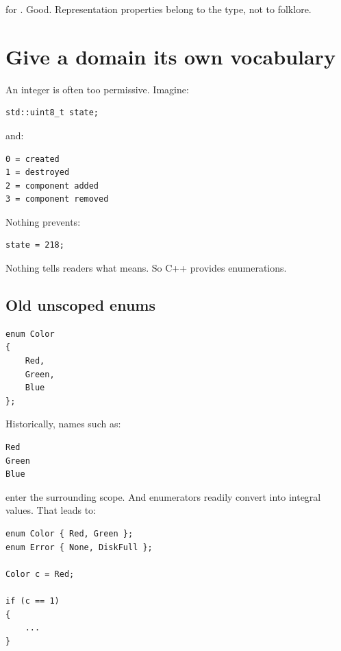 for . Good. Representation properties belong to the type, not to folklore.

\section{Give a domain its own vocabulary}\label{05-engine-i-ch002-give-a-domain-its-own-vocabulary}

\hypertarget{05-engine-i-ch002-give-a-domain-its-own-vocabulary}{}

An integer is often too permissive. Imagine:

\begin{verbatim}
std::uint8_t state;
\end{verbatim}

and:

\begin{verbatim}
0 = created
1 = destroyed
2 = component added
3 = component removed
\end{verbatim}

Nothing prevents:

\begin{verbatim}
state = 218;
\end{verbatim}

Nothing tells readers what  means. So C++ provides enumerations.

\subsection{Old unscoped enums}\label{05-engine-i-ch002-old-unscoped-enums}

\hypertarget{05-engine-i-ch002-old-unscoped-enums}{}

\begin{verbatim}
enum Color
{
    Red,
    Green,
    Blue
};
\end{verbatim}

Historically, names such as:

\begin{verbatim}
Red
Green
Blue
\end{verbatim}

enter the surrounding scope. And enumerators readily convert into integral values. That leads to:

\begin{verbatim}
enum Color { Red, Green };
enum Error { None, DiskFull };

Color c = Red;

if (c == 1)
{
    ...
}
\end{verbatim}

